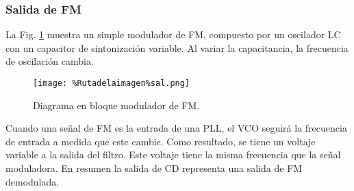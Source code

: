 \documentclass{article}
\begin{document}
\subsubsection{Salida de FM}
La Fig. \ref{sal} muestra un simple modulador de FM, compuesto por un oscilador LC con un capacitor de sintonización variable. Al variar la capacitancia, la frecuencia de oscilación cambia.

\begin{figure}[htbp]
    \centering
    \texttt{[image: \%Rutadelaimagen\%sal.png]}
    \caption{Diagrama en bloque modulador de FM.}
    \label{sal}
\end{figure}

Cuando una señal de FM es la entrada de una PLL, el VCO seguirá la frecuencia de entrada a medida que este cambie. Como resultado, se tiene un voltaje variable a la salida del filtro. Este voltaje tiene la misma frecuencia que la señal 
moduladora. 
En resumen la salida de CD representa una salida de FM demodulada.
\end{document}

